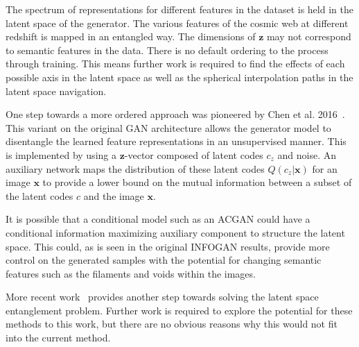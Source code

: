 \documentclass[twocolumn]{article}
\numberwithin{equation}{section}
\begin{document}
The spectrum of representations for different features in the dataset is held in the latent space of the generator. The 
various features of the cosmic web at different redshift is mapped in an entangled way. The dimensions of $\mathbf{z}$ may 
not correspond to semantic features in the data. There is no default ordering to the process through training. This means 
further work is required to find the effects of each possible axis in the latent space as well as the spherical interpolation paths in the latent space navigation. 

One step towards a more ordered approach was pioneered by Chen et al. 2016~\cite{infogan}. This variant on the original GAN 
architecture allows the generator model to disentangle the learned feature representations in an unsupervised manner. This 
is implemented by using a $\mathbf{z}$-vector composed of latent codes $c_z$ and noise. An auxiliary network maps the 
distribution of these latent codes $Q(c_z|\mathbf{x})$ for an image $\mathbf{x}$ to provide a lower bound on the mutual 
information between a subset of the latent codes $c$ and the image $\mathbf{x}$.

It is possible that a conditional model such as an ACGAN could have a conditional information maximizing auxiliary component
to structure the latent space. This could, as is seen in the original INFOGAN results, provide more control on the generated
samples with the potential for changing semantic features such as the filaments and voids within the images.

More recent work~\cite{latent_disentanglement} provides another step towards solving the latent space entanglement problem.
Further work is required to explore the potential for these methods to this work, but there are no obvious reasons why this
would not fit into the current method. 
\end{document}
